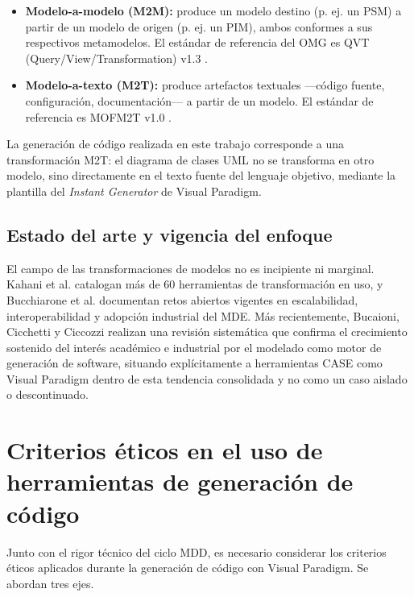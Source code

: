 \documentclass[11pt,a4paper]{article}
\begin{document}
\begin{itemize}
  \item \textbf{Modelo-a-modelo (M2M):} produce un modelo destino (p. ej. un PSM) a partir de un modelo de origen (p. ej. un PIM), ambos conformes a sus respectivos metamodelos. El estándar de referencia del OMG es QVT (Query/View/Transformation) v1.3 \cite{omg2016qvt}.
  \item \textbf{Modelo-a-texto (M2T):} produce artefactos textuales —código fuente, configuración, documentación— a partir de un modelo. El estándar de referencia es MOFM2T v1.0 \cite{omg2008mofm2t}.
\end{itemize}
 
La generación de código realizada en este trabajo corresponde a una transformación M2T: el diagrama de clases UML no se transforma en otro modelo, sino directamente en el texto fuente del lenguaje objetivo, mediante la plantilla del \textit{Instant Generator} de Visual Paradigm.

\subsection{Estado del arte y vigencia del enfoque}
\label{sec:estado-arte}
El campo de las transformaciones de modelos no es incipiente ni marginal. Kahani et al. \cite{kahani2019} catalogan más de 60 herramientas de transformación en uso, y Bucchiarone et al. \cite{bucchiarone2020} documentan retos abiertos vigentes en escalabilidad, interoperabilidad y adopción industrial del MDE. Más recientemente, Bucaioni, Cicchetti y Ciccozzi \cite{bucaioni2022} realizan una revisión sistemática que confirma el crecimiento sostenido del interés académico e industrial por el modelado como motor de generación de software, situando explícitamente a herramientas CASE como Visual Paradigm dentro de esta tendencia consolidada y no como un caso aislado o descontinuado.

\section{Criterios éticos en el uso de herramientas de generación de código}
\label{sec:etica-ia}
Junto con el rigor técnico del ciclo MDD, es necesario considerar los criterios éticos aplicados durante la generación de código con Visual Paradigm. Se abordan tres ejes.
\end{document}
